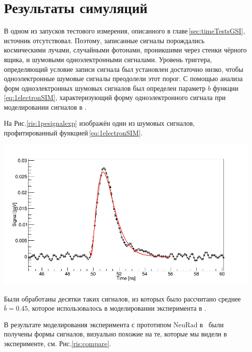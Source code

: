 \section{Результаты симуляций}

В одном из запусков тестового измерения, описанного в главе\,\ref{sec:timeTestsGSI}, источник отсутствовал. Поэтому, записанные сигналы порождались космическими лучами, случайными фотонами, проникшими через стенки чёрного ящика, и шумовыми одноэлектронными сигналами. Уровень триггера, определяющий условие записи сигнала был установлен достаточно низко, чтобы одноэлектронные шумовые сигналы преодолели этот порог. С помощью анализа форм одноэлектронных шумовых сигналов был определен параметр $b$ функции\,\ref{eq:1electronSIM}, характеризующий форму одноэлектронного сигнала при моделировании сигналов в \er.

На Рис.\ref{ris:1pesignalexp} изображён один из шумовых сигналов, профитированный функцией\,\ref{eq:1electronSIM}. 

{
	\centering
	\includegraphics[width=\linewidth]{1pesignalexp.png}
	\label{ris:1pesignalexp}
}

Были обработаны десятки таких сигналов, из которых было рассчитано среднее $\bar{b}=0.45$, которое использовалось в моделировании эксперимента в \er.

В результате моделирования эксперимента с прототипом NeuRad в \er\, были получены формы сигналов, визуально похожие на те, которые мы видели в эксперименте, см. Рис.\ref{ris:compare}.

